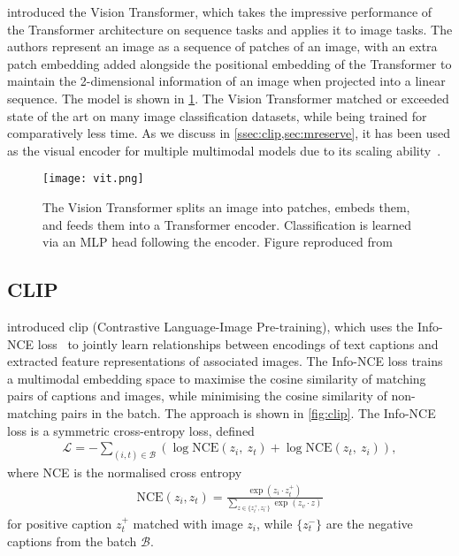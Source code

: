 \citet{dosovitskiy2021vit} introduced the Vision Transformer, which takes the
impressive performance of the Transformer architecture on sequence tasks and
applies it to image tasks. The authors represent an image as a sequence of
patches of an image, with an extra patch embedding added alongside the
positional embedding of the Transformer to maintain the 2-dimensional
information of an image when projected into a linear sequence. The model is
shown in \cref{fig:vit}. The Vision Transformer matched or exceeded state of
the art on many image classification datasets, while being trained for
comparatively less time. As we discuss in \cref{ssec:clip,sec:mreserve}, it has
been used as the visual encoder for multiple multimodal models due to its
scaling ability~\citep{zhai2022scalingvit}.

\begin{figure}[tp]
	\centering
	\texttt{[image: vit.png]}
	\caption{The Vision Transformer splits an image into patches, embeds them,
		and feeds them into a Transformer encoder. Classification is learned
		via an MLP head following the encoder. Figure reproduced
		from~\citet{dosovitskiy2021vit}}
	\label{fig:vit}
\end{figure}


\subsection{CLIP}
\label{ssec:clip}

\citet{radford2021clip} introduced \acrshort{clip} (Contrastive Language-Image
Pre-training), which uses the Info-NCE loss~\citep{oord2019infonce} to jointly
learn relationships between encodings of text captions and extracted feature
representations of associated images. The Info-NCE loss trains a multimodal
embedding space to maximise the cosine similarity of matching pairs of captions
and images, while minimising the cosine similarity of non-matching pairs in the
batch. The approach is shown in \cref{fig:clip}. The Info-NCE loss is a
symmetric cross-entropy loss, defined
\begin{align*}
	\mathcal{L} = - \sum_{(i,t) \in \mathcal{B}} 
		\left(\log \mathrm{NCE}(z_{i},~z_{t}) + \log \mathrm{NCE}(z_{t},~z_{i}) \right)
,\end{align*}
where NCE is the normalised cross entropy
\begin{align*}
	\mathrm{NCE}(z_{i}, z_{t}) = \frac{\exp(z_{i}\cdot z_{t}^{+})}
	{\sum_{z\in\{z_{t}^{+},z_{t}^{-}\}} \exp(z_{v}\cdot z)}
\end{align*}
for positive caption $z_{t}^{+}$ matched with image $z_{i}$, while $\{z_{t}^{-}\}$ are
the negative captions from the batch $\mathcal{B}$.

